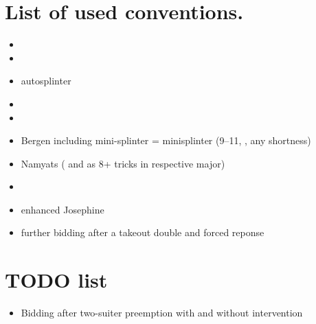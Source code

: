 \documentclass[12pt,a4paper,twoside]{article}
\begin{document}
  \section{List of used conventions.}
  \begin{itemize}
    \item 
    \item 
    \item autosplinter
    \item 
    \item {}
    \item Bergen including mini-splinter \newline
       = minisplinter (9--11, , any shortness)
    \item Namyats ( and  as 8+ tricks in respective major)
    \item 
    \item enhanced Josephine 
    \item further bidding after a takeout double and forced reponse
  \end{itemize}

  \section{TODO list}
  \begin{itemize}
    \item Bidding after two-suiter preemption with and without intervention
  \end{itemize}
\end{document}
